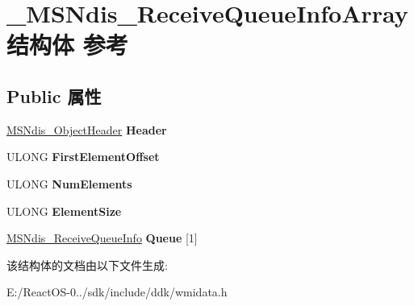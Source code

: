 \hypertarget{struct___m_s_ndis___receive_queue_info_array}{}\section{\+\_\+\+M\+S\+Ndis\+\_\+\+Receive\+Queue\+Info\+Array结构体 参考}
\label{struct___m_s_ndis___receive_queue_info_array}
\subsection*{Public 属性}
\begin{DoxyCompactItemize}
\item 
\mbox{\label{struct___m_s_ndis___receive_queue_info_array_a05dcf27decd698fa858cd42fc9fef61c}} 
\hyperlink{struct___m_s_ndis___object_header}{M\+S\+Ndis\+\_\+\+Object\+Header} {\bfseries Header}
\item 
\mbox{\label{struct___m_s_ndis___receive_queue_info_array_a3ad4aab4a9fce7eb350018ce6be3042a}} 
U\+L\+O\+NG {\bfseries First\+Element\+Offset}
\item 
\mbox{\label{struct___m_s_ndis___receive_queue_info_array_ac33d462d774cde3453886cfd9624f5f7}} 
U\+L\+O\+NG {\bfseries Num\+Elements}
\item 
\mbox{\label{struct___m_s_ndis___receive_queue_info_array_ad9409a97ecacc3e043d5f40621ec606c}} 
U\+L\+O\+NG {\bfseries Element\+Size}
\item 
\mbox{\label{struct___m_s_ndis___receive_queue_info_array_a28cdd1ada4461a769da96a728466446a}} 
\hyperlink{struct___m_s_ndis___receive_queue_info}{M\+S\+Ndis\+\_\+\+Receive\+Queue\+Info} {\bfseries Queue} \mbox{[}1\mbox{]}
\end{DoxyCompactItemize}


该结构体的文档由以下文件生成\+:\begin{DoxyCompactItemize}
\item 
E\+:/\+React\+O\+S-\/0../sdk/include/ddk/wmidata.\+h\end{DoxyCompactItemize}
